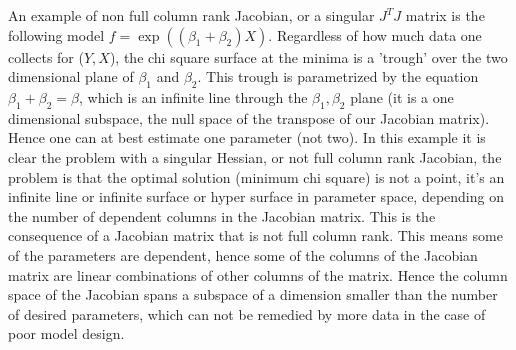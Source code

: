 An example of non full column rank Jacobian, or a singular $J^TJ$ matrix is the following model $f = \exp{((\beta_1 + \beta_2 )X)}$\cite{beck}.  Regardless of how much data one collects for ($Y,X$), the chi square surface at the minima is a 'trough' over the two dimensional plane of $\beta_1$ and $\beta_2$.  This trough is parametrized by the equation  $\beta_1+ \beta_2=\beta$, which is an infinite line through the $\beta_1,\beta_2$ plane (it is a one dimensional subspace, the null space of the transpose of our Jacobian matrix).  Hence one can at best estimate one parameter (not two).  In this example it is clear the problem with a singular Hessian, or not full column rank Jacobian, the problem is that the optimal solution (minimum chi square) is not a point, it's an infinite line or infinite surface or hyper surface in parameter space, depending on the number of dependent columns in the Jacobian matrix.  This is the consequence of a Jacobian matrix that is not full column rank.  This means some of the parameters are dependent, hence some of the columns of the Jacobian matrix are linear combinations of other columns of the matrix.  Hence the column space of the Jacobian spans a subspace of a dimension smaller than the number of desired parameters, which can not be remedied by more data in the case of poor model design.

